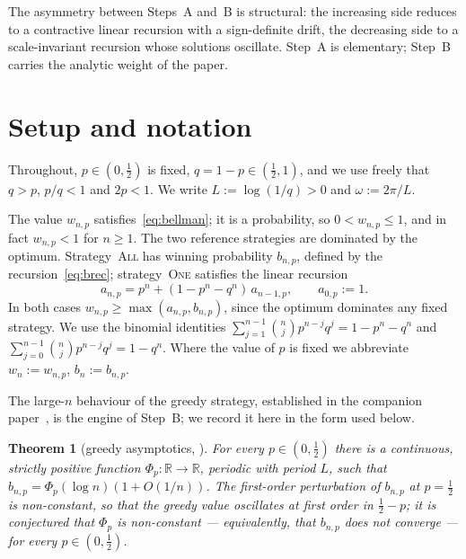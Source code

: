 \documentclass[11pt]{article}
\newtheorem{theorem}{Theorem}[section]
\theoremstyle{definition}
\newcommand{\One}{\textsc{One}}
\newcommand{\All}{\textsc{All}}
\newcommand{\R}{\mathbb{R}}
\begin{document}
The asymmetry between Steps~A and~B is structural: the increasing side
reduces to a contractive linear recursion with a sign-definite drift,
the decreasing side to a scale-invariant recursion whose solutions
oscillate. Step~A is elementary; Step~B carries the analytic weight of
the paper.

\section{Setup and notation}\label{sec:setup}

Throughout, $p\in(0,\tfrac12)$ is fixed, $q=1-p\in(\tfrac12,1)$, and
we use freely that $q>p$, $p/q<1$ and $2p<1$. We write
$L:=\log(1/q)>0$ and $\omega:=2\pi/L$.

The value $w_{n,p}$ satisfies~\eqref{eq:bellman}; it is a probability,
so $0<w_{n,p}\le1$, and in fact $w_{n,p}<1$ for $n\ge1$. The two
reference strategies are dominated by the optimum. Strategy~\All{} has
winning probability $b_{n,p}$, defined by the
recursion~\eqref{eq:brec}; strategy~\One{} satisfies the linear
recursion
\begin{equation}\label{eq:arec}
  a_{n,p}=p^{n}+(1-p^{n}-q^{n})\,a_{n-1,p},\qquad a_{0,p}:=1 .
\end{equation}
In both cases $w_{n,p}\ge\max(a_{n,p},b_{n,p})$, since the optimum
dominates any fixed strategy. We use the binomial identities
$\sum_{j=1}^{n-1}\binom nj p^{n-j}q^j=1-p^n-q^n$ and
$\sum_{j=0}^{n-1}\binom nj p^{n-j}q^j=1-q^n$. Where the value of $p$
is fixed we abbreviate $w_n:=w_{n,p}$, $b_n:=b_{n,p}$.

The large-$n$ behaviour of the greedy strategy, established in the
companion paper~\cite{Paper2}, is the engine of Step~B; we record it
here in the form used below.

\begin{theorem}[greedy asymptotics, \cite{Paper2}]\label{thm:import}
  For every $p\in(0,\tfrac12)$ there is a continuous, strictly
  positive function $\Phi_p:\R\to\R$, periodic with period $L$, such
  that $b_{n,p}=\Phi_p(\log n)(1+O(1/n))$. The first-order
  perturbation of $b_{n,p}$ at $p=\tfrac12$ is non-constant, so that
  the greedy value oscillates at first order in $\tfrac12-p$; it is
  conjectured that $\Phi_p$ is non-constant --- equivalently, that
  $b_{n,p}$ does not converge --- for every $p\in(0,\tfrac12)$.
\end{theorem}
\end{document}
